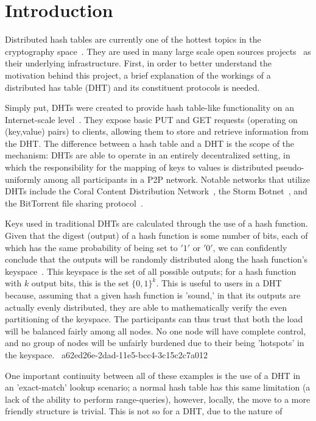 \documentclass[12pt]{article}
\begin{document}
\section{Introduction}
\par Distributed hash tables are currently one of the hottest topics in the cryptography space~\cite{Stoica:2001dj,Rowstron:2001ea,Ratnasamy:2001wn}. They are used in many large scale open sources projects~\cite{Freitas:2013tb,Xu:2010vs,Perfitt:2010fh} as their underlying infrastructure. First, in order to better understand the motivation behind this project, a brief explanation of the workings of a distributed has table (DHT) and its constituent protocols is needed.

\par Simply put, DHTs were created to provide hash table-like functionality on an Internet-scale level~\cite{Ratnasamy:2001wn}. They expose basic PUT and GET requests (operating on (key,value) pairs) to clients, allowing them to store and retrieve information from the DHT. The difference between a hash table and a DHT is the scope of the mechanism: DHTs are able to operate in an entirely decentralized setting, in which the responsibility for the mapping of keys to values is distributed pseudo-uniformly among all participants in a P2P network. Notable networks that utilize DHTs include the Coral Content Distribution Network~\cite{Freedman:2004vb}, the Storm Botnet~\cite{Holz:2008uk}, and the BitTorrent file sharing protocol~\cite{Cohen:y1_8mBnw}.

\par Keys used in traditional DHTs are calculated through the use of a hash function. Given that the digest (output) of a hash function is some number of bits, each of which has the same probability of being set to $'1'$ or $'0'$, we can confidently conclude that the outputs will be randomly distributed along the hash function's keyspace~. This keyspace is the set of all possible outputs; for a hash function with $k$ output bits, this is the set $\{0,1\}^k$. This is useful to users in a DHT because, assuming that a given hash function is 'sound,' in that its outputs are actually evenly distributed, they are able to mathematically verify the even partitioning of the keyspace. The participants can thus trust that both the load will be balanced fairly among all nodes. No one node will have complete control, and no group of nodes will be unfairly burdened due to their being 'hotspots' in the keyspace.~
a62ed26e-2dad-11e5-bcc4-3c15c2c7a012
\par One important continuity between all of these examples is the use of a DHT in an 'exact-match' lookup scenario; a normal hash table has this same limitation (a lack of the ability to perform range-queries), however, locally, the move to a more friendly structure is trivial. This is not so for a DHT, due to the nature of
\printbibliography
\end{document}
